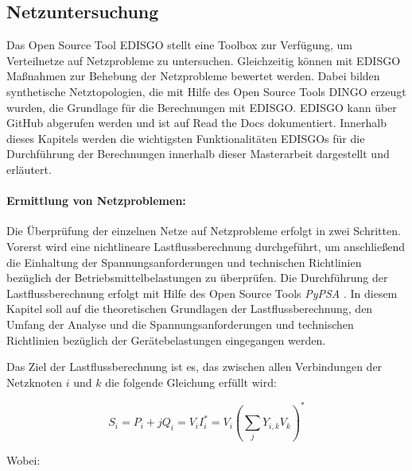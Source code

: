 \subsection{Netzuntersuchung}\label{chap:edisgo_theo}

Das Open Source Tool \gls{EDISGO} stellt eine Toolbox zur Verfügung, um Verteilnetze auf Netzprobleme zu untersuchen.
Gleichzeitig können mit \gls{EDISGO} Maßnahmen zur Behebung der Netzprobleme bewertet werden.
Dabei bilden synthetische Netztopologien, die mit Hilfe des Open Source Tools \gls{DINGO} erzeugt wurden, die Grundlage für die Berechnungen mit \gls{EDISGO}.
\gls{EDISGO} kann über GitHub \cite{edisgoGit2019} abgerufen werden und ist auf Read the Docs \cite{edisgoDocs2017} dokumentiert.
Innerhalb dieses Kapitels werden die wichtigsten Funktionalitäten \glspl{EDISGO} für die Durchführung der Berechnungen innerhalb dieser Masterarbeit dargestellt und erläutert.


\paragraph{Ermittlung von Netzproblemen:}\label{chap:grid_issues}

Die Überprüfung der einzelnen Netze auf Netzprobleme erfolgt in zwei Schritten.
Vorerst wird eine nichtlineare Lastflussberechnung durchgeführt, um anschließend die Einhaltung der Spannungsanforderungen und technischen Richtlinien bezüglich der Betriebsmittelbelastungen zu überprüfen.
Die Durchführung der Lastflussberechnung erfolgt mit Hilfe des Open Source Tools \textit{PyPSA} \cite{Brown2020}.
In diesem Kapitel soll auf die theoretischen Grundlagen der Lastflussberechnung, den Umfang der Analyse und die Spannungsanforderungen und technischen Richtlinien bezüglich der Gerätebelastungen eingegangen werden.\medskip

Das Ziel der Lastflussberechnung ist es, das zwischen allen Verbindungen der Netzknoten $i$ und $k$ die folgende Gleichung erfüllt wird:

\begin{equation}
	S_i = P_i + j Q_i = V_i I_i^* = V_i \left(\sum_j Y_{i,k} V_k \right)^*
	\label{eq:pf}
\end{equation}

\noindent Wobei:


